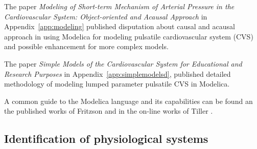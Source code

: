 The paper \cite{Kulhanek2014Modeling} \emph{Modeling of Short-term Mechanism of Arterial Pressure in the Cardiovascular System: Object-oriented and Acausal Approach} in Appendix~\ref{app:modeling} published disputation about causal and acausal approach in using Modelica for modeling pulsatile cardiovascular system (CVS) and possible enhancement for more complex models. 

The paper \cite{Kulhanek2014mefanet} \emph{Simple Models of the Cardiovascular System for Educational and Research Purposes} in Appendix~\ref{app:simplemodelsd}, published detailed methodology of modeling lumped parameter pulsatile CVS in Modelica. 

A common guide to the Modelica language and its capabilities can be found an the published works of Fritzson \cite{fritzson2002} and in the on-line works of Tiller \cite{Tiller2014}.


\subsection{Identification of physiological systems}
\label{sec:estimation}

